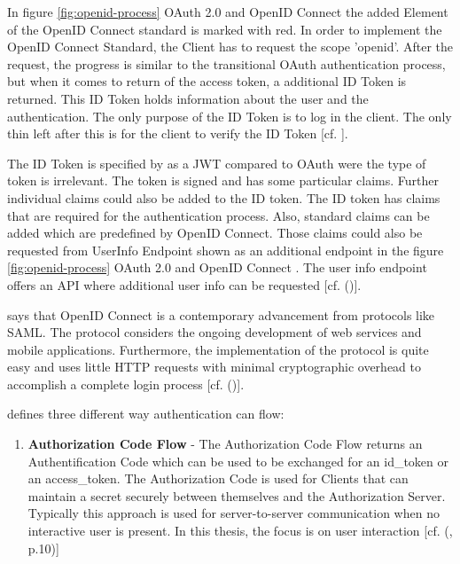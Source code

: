 {{{	
	In figure \ref{fig:openid-process} OAuth 2.0 and OpenID Connect \cite{Lodderstedt:2014:OpenID} the added Element of the OpenID Connect standard is marked with red. In order to implement the OpenID Connect Standard, the Client has to request the scope 'openid'. After the request, the progress is similar to the transitional OAuth authentication process, but when it comes to return of the access token, a additional ID Token is returned. This ID Token holds information about the user and the authentication. The only purpose of the ID Token is to log in the client. The only thin left after this is for the client to verify the ID Token [cf. \cite{Lodderstedt:2014:OpenID}]. 
	
	The ID Token is specified by \cite{Sakimura:2014:OpenIDConnect} as a JWT compared to OAuth were the type of token is irrelevant. The token is signed and has some particular claims. Further individual claims could also be added to the ID token. The ID token has claims that are required for the authentication process. Also, standard claims can be added which are predefined by OpenID Connect. Those claims could also be requested from UserInfo Endpoint shown as an additional endpoint in the figure \ref{fig:openid-process} OAuth 2.0 and OpenID Connect \cite{Lodderstedt:2014:OpenID}. The user info endpoint offers an API where additional user info can be requested [cf. (\cite{Sakimura:2014:OpenIDConnect})].
	
	\cite{Lodderstedt:2014:OpenID} says that OpenID Connect is a contemporary advancement from protocols like SAML. The protocol considers the ongoing development of web services and mobile applications. Furthermore, the implementation of the protocol is quite easy and uses little HTTP requests with minimal cryptographic overhead to accomplish a complete login process [cf. (\cite{Lodderstedt:2014:OpenID})]. 
	
	
	
	
	
	
	\cite{Sakimura:2014:OpenIDConnect} defines three different way authentication can flow:
	
	
	\begin{enumerate}
		\item \textbf{Authorization Code Flow}  - The Authorization Code Flow returns an Authentification Code which can be used to be exchanged for an id\_token or an access\_token. The Authorization Code is used for Clients that can maintain a secret securely between themselves and the Authorization Server. Typically this approach is used for server-to-server communication when no interactive user is present. In this thesis, the focus is on user interaction [cf. (\cite{Sakimura:2014:OpenIDConnect}, p.10)]
		

\end{enumerate}}}}
